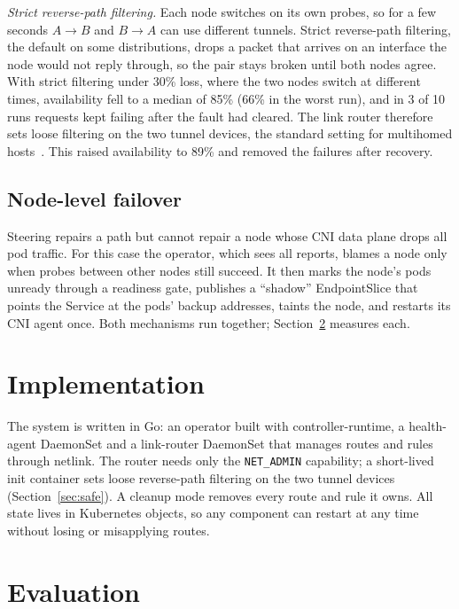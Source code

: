 \documentclass[conference,compsoc]{IEEEtran}
\begin{document}
\emph{Strict reverse-path filtering.} Each node switches on its own probes, so for a
few seconds $A\to B$ and $B\to A$ can use different tunnels. Strict reverse-path
filtering, the default on some distributions, drops a packet that arrives on an
interface the node would not reply through, so the pair stays broken until both nodes
agree. With strict filtering under 30\% loss, where the two nodes switch at different
times, availability fell to a median of 85\% (66\% in the worst run), and in 3 of 10
runs requests kept failing after the fault had cleared. The link router therefore sets
loose filtering on the two tunnel devices, the standard setting for multihomed
hosts~\cite{rfc3704}. This raised availability to 89\% and removed the failures after
recovery.

\subsection{Node-level failover}
Steering repairs a path but cannot repair a node whose CNI data plane drops all pod
traffic. For this case the operator, which sees all reports, blames a node only when
probes between other nodes still succeed. It then marks the node's pods unready through
a readiness gate, publishes a ``shadow'' EndpointSlice that points the Service at the
pods' backup addresses, taints the node, and restarts its CNI agent once. Both
mechanisms run together; Section~\ref{sec:eval} measures each.

\section{Implementation}
\label{sec:impl}
The system is written in Go: an operator built with controller-runtime, a
health-agent DaemonSet and a
link-router DaemonSet that manages routes and rules through netlink. The router needs
only the \texttt{NET\_ADMIN} capability; a short-lived init container sets loose
reverse-path filtering on the two tunnel devices (Section~\ref{sec:safe}). A
cleanup mode removes every route and rule it owns. All state lives in Kubernetes
objects, so any component can restart at any time without losing or misapplying routes.

\section{Evaluation}
\label{sec:eval}
\end{document}
